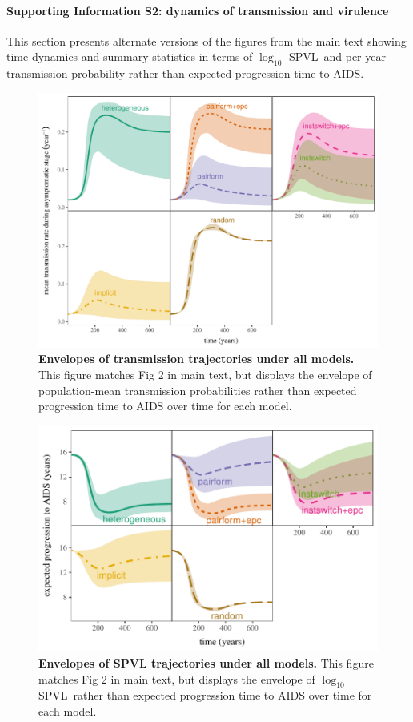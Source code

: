\documentclass[10pt,letterpaper]{article}
\date{}
\newcommand{\Lspvl}{$\log_{10}$ SPVL}
\begin{document}
\paragraph*{Supporting Information S2: dynamics of transmission and virulence}

This section presents alternate versions of
the figures from the main text showing time dynamics and summary
statistics in terms of \Lspvl\ and per-year transmission probability
rather than expected progression time to AIDS.

\begin{figure}[!ht]
\includegraphics[width=\textwidth]{../figures/fig_S2_1.pdf}
\caption{{\bf Envelopes of transmission trajectories under all models.}
This figure matches Fig 2 in main text, but displays the
envelope of population-mean transmission probabilities rather than expected progression time to AIDS over time
for each model.
}
\label{fig:transtraj}
\end{figure}

\clearpage

\begin{figure}[!ht]
\includegraphics[width=\textwidth]{../figures/fig_S2_2.pdf}
\caption{{\bf Envelopes of SPVL trajectories under all models.}
This figure matches Fig 2 in main text, but displays the
envelope of \Lspvl\ rather than expected progression time to AIDS over time
for each model.
}
\label{fig:virtraj}
\end{figure}
\end{document}
